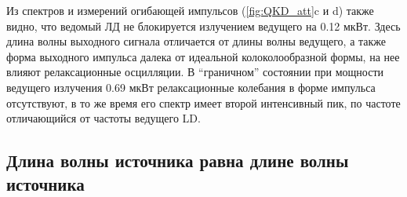 Из спектров и измерений огибающей импульсов (\cref{fig:QKD_att}c и d) также видно, что ведомый ЛД не блокируется излучением ведущего на 0.12 мкВт. Здесь длина волны выходного сигнала отличается от длины волны ведущего, а также форма выходного импульса далека от идеальной колоколообразной формы, на нее влияют релаксационные осцилляции. В ``граничном'' состоянии при мощности ведущего излучения 0.69 мкВт релаксационные колебания в форме импульса отсутствуют, в то же время его спектр имеет второй интенсивный пик, по частоте отличающийся от частоты ведущего LD.

\subsection{Длина волны источника равна длине волны источника}

